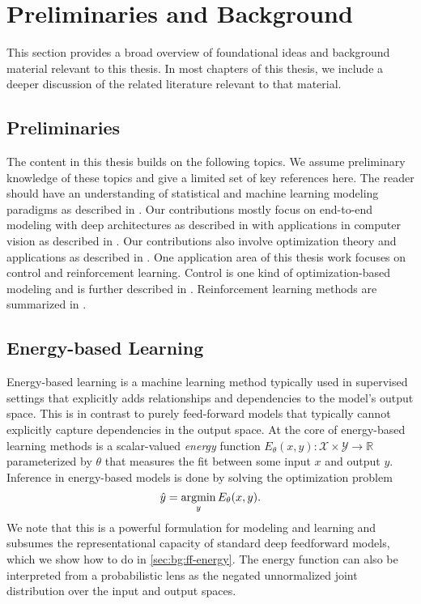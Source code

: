\chapter{Preliminaries and Background}
This section provides a broad overview of foundational ideas
and background material relevant to this thesis.
In most chapters of this thesis, we include a deeper
discussion of the related literature relevant to
that material.

\section{Preliminaries}
The content in this thesis builds on the following topics.
We assume preliminary knowledge of these topics and
give a limited set of key references here.
The reader should have an understanding of statistical
and machine learning modeling paradigms as described in
\citet{wasserman2013all,bishop2007pattern,friedman2001elements}.
Our contributions mostly focus on end-to-end modeling with
deep architectures as described in
\citet{schmidhuber2015deep,goodfellow2016deep} with
applications in computer vision as described in
\citet{forsyth2003modern,bishop2007pattern,szeliski2010computer}.
Our contributions also involve optimization theory and
applications as described in
\citet{bertsekas1999nonlinear,boyd2004convex,bonnans2013perturbation,griewank2008evaluating,nocedal2006sequential,sra2012optimization,wright1997primal}.
One application area of this thesis work focuses on control
and reinforcement learning.
Control is one kind of optimization-based modeling and
is further described in
\citet{bertsekas2005dynamic,sastry2011adaptive,levine2017optimal}.
Reinforcement learning methods are summarized in
\citet{sutton1998reinforcement,levine2017introduction}.

\section{Energy-based Learning}
Energy-based learning is a machine learning method
typically used in supervised settings that explicitly
adds relationships and dependencies to the model's
output space.
This is in contrast to purely feed-forward models that
typically cannot explicitly capture dependencies
in the output space.
At the core of energy-based learning methods is
a scalar-valued \emph{energy} function
$E_\theta(x,y): \mathcal{X}\times\mathcal{Y}\rightarrow \mathbb{R}$
parameterized by $\theta$ that measures the fit
between some input $x$ and output $y$.
Inference in energy-based models is done by
solving the optimization problem
\begin{equation}
  \label{eq:bg:inf}
  \hat y = \operatorname*{argmin}_{y} E_\theta(x, y).
\end{equation}
We note that this is a powerful formulation for
modeling and learning and subsumes the representational
capacity of standard deep feedforward models,
which we show how to do in \cref{sec:bg:ff-energy}.
The energy function can also be interpreted
from a probabilistic lens as the negated unnormalized
joint distribution over the input and output spaces.

